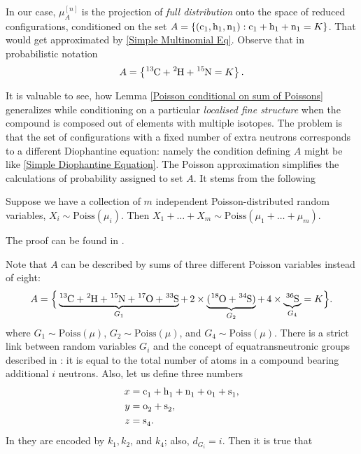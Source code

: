 In our case, $\mu^{[n]}_A$ is the projection of {\it full distribution} onto the space of reduced configurations, conditioned on the set $A = \left\{ ( \cem{c}_1, \cem{h}_1, \cem{n}_1 ) :  \cem{c}_1 + \cem{h}_1 + \cem{n}_1 = K\right\}$. That would get approximated by \eqref{Simple Multinomial Eq}. Observe that in probabilistic notation
$$ A =  \left\{ \cem{^{13}C} + \cem{^2H} + \cem{^{15}N} = K \right\}.$$  


It is valuable to see, how Lemma \ref{Poisson conditional on sum of Poissons} generalizes while conditioning on a particular {\it localised fine structure} when the compound is composed out of elements with multiple isotopes. The problem is that the set of configurations with a fixed number of extra neutrons corresponds to a different Diophantine equation: namely the condition defining $A$ might be like \eqref{Simple Diophantine Equation}. The Poisson approximation simplifies the calculations of probability assigned to set $A$. It stems from the following


\begin{lemma}\label{sum of independent Poissons lemma}
	Suppose we have a collection of $m$ independent Poisson-distributed random variables, $X_i \sim \mathrm{Poiss}(\mu_i)$. Then $X_1 + \dots + X_m \sim \mathrm{Poiss}(\mu_1 + \dots + \mu_m)$. 
\end{lemma}  
The proof can be found in \cite{Kingman1993PoissonProcesses}. 


Note that $A$ can be described by sums of three different Poisson variables instead of eight:
\begin{equation}\label{setA}
	A = \Big\{ \underbrace{\cem{^{13}C} + \cem{^2H} + \cem{^{15}N} + \cem{^{17}O} + \cem{^{33}S}}_{ G_1 } + \,2 \times \underbrace{( \cem{^{18}O} + \cem{^{34}S} )}_{ G_2 } + \,4 \times \underbrace{\cem{^{36}S}}_{ G_4 } = K \Big\}.	
\end{equation}
where $G_1 \sim \mathrm{Poiss}(\mu)$, $G_2 \sim \mathrm{Poiss}(\mu)$, and $G_4 \sim \mathrm{Poiss}(\mu)$. There is a strict link between random variables $G_i$ and the concept of equatransneutronic groups described in \cite{Olson2009Calculations}: it is equal to the total number of atoms in a compound bearing additional $i$ neutrons. Also, let us define three numbers
\begin{align*}
	x 	& = \cem{c_1} + \cem{h_1} + \cem{n_1} + \cem{o_1} + \cem{s_1}, \\	  	
	y 	& = \cem{o_2} + \cem{s_2}, 	\\
	z 	& = \cem{s_4}.
\end{align*}
In \cite{Olson2009Calculations} they are encoded by $k_1, k_2$, and $k_4$; also, $d_{G_i} = i$. Then it is true that

